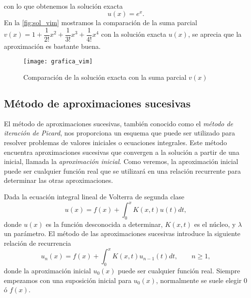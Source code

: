 \begin{ejemplo}
\begin{align}
	\end{align}
	con lo que obtenemos la solución exacta
	\begin{equation}
		u(x) = e^x.
	\end{equation}
	En la \autoref{fig:sol_vim} mostramos la comparación de la suma parcial $v(x) = 1 + \dfrac{1}{2!}x^2 + \dfrac{1}{3!}x^3+\dfrac{1}{4!}x^4$ con la solución exacta $u(x)$, se aprecia que la aproximación es bastante buena.
	\begin{figure}[h!]
		\centering
		\texttt{[image: grafica\_vim]}
		\caption{Comparación de la solución exacta con la suma parcial $v(x)$}
		\label{fig:sol_vim}
	\end{figure}
\end{ejemplo}

\subsection{Método de aproximaciones sucesivas}
El método de aproximaciones sucesivas, también conocido como el \textit{método de iteración de Picard}, nos proporciona un esquema que puede ser utilizado para resolver problemas de valores iniciales o ecuaciones integrales. Este método encuentra aproximaciones sucesivas que convergen a la solución a partir de una inicial, llamada la \textit{aproximación inicial}. Como veremos, la aproximación inicial puede ser cualquier función real que se utilizará en una relación recurrente para determinar las otras aproximaciones.

Dada la ecuación integral lineal de Volterra de segunda clase
\begin{equation}
	u(x) = f(x) +\int_{0}^{x} K(x,t)u(t)dt,
\end{equation}
donde $u(x)$ es la función desconocida a determinar, $K(x,t)$ es el núcleo, y $\lambda$ un parámetro. El método de las aproximaciones sucesivas introduce la siguiente relación de recurrencia
\begin{equation}\label{eq:wowo}
	u_n(x) = f(x) + \int_{0}^{x} K(x,t)u_{n-1}(t)dt, \qquad n \geqslant 1,
\end{equation}
donde la aproximación inicial $u_0(x)$ puede ser cualquier función real. Siempre empezamos con una suposición inicial para $u_0(x)$, normalmente se suele elegir $0$ ó $f(x)$.

